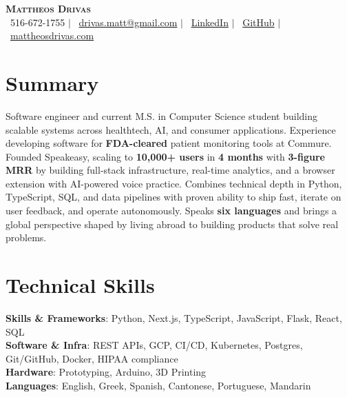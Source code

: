 \documentclass[letterpaper,10.5pt]{article}
\begin{document}
\begin{center}
    \textbf{\Huge \scshape Mattheos Drivas} \\ \vspace{1pt}
    \small \faPhone\ 516-672-1755 $|$ \faEnvelope\ \href{mailto:drivas.matt@gmail.com}{drivas.matt@gmail.com} $|$
    \faLinkedin\ \href{https://linkedin.com/in/mattheos-drivas-803188276}{LinkedIn} $|$
    \faGithub\ \href{https://github.com/mdrivas}{GitHub} $|$
    \faGlobe\ \href{https://mattheosdrivas.com}{mattheosdrivas.com}
\end{center}


\section{Summary}
\small{Software engineer and current M.S. in Computer Science student building scalable systems across healthtech, AI, and consumer applications. Experience developing software for \textbf{FDA-cleared} patient monitoring tools at Commure. Founded Speakeasy, scaling to \textbf{10,000+ users} in \textbf{4 months} with \textbf{3-figure MRR} by building full-stack infrastructure, real-time analytics, and a browser extension with AI-powered voice practice. Combines technical depth in Python, TypeScript, SQL, and data pipelines with proven ability to ship fast, iterate on user feedback, and operate autonomously. Speaks \textbf{six languages} and brings a global perspective shaped by living abroad to building products that solve real problems.}


\section{Technical Skills}
 \begin{itemize}[leftmargin=0.15in, label={}]
    \small{\item{
     \textbf{Skills \& Frameworks}{: Python, Next.js, TypeScript, JavaScript, Flask, React, SQL} \\
     \textbf{Software \& Infra}{: REST APIs, GCP, CI/CD, Kubernetes, Postgres, Git/GitHub, Docker, HIPAA compliance} \\
     \textbf{Hardware}{: Prototyping, Arduino, 3D Printing} \\
     \textbf{Languages}{: English, Greek, Spanish, Cantonese, Portuguese, Mandarin}
    }}
 \end{itemize}
\end{document}
